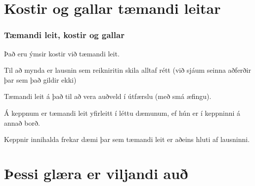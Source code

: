 \section{Kostir og gallar tæmandi leitar}
{
    \frametitle{Tæmandi leit, kostir og gallar}
    {
        \item<1-> Það eru ýmsir kostir við tæmandi leit.
        \item<2-> Til að mynda er lausnin sem reikniritin skila alltaf rétt (við sjáum seinna aðferðir þar sem það gildir ekki)
        \item<3-> Tæmandi leit á það til að vera auðveld í útfærslu (með smá æfingu).
        \item<4-> Á keppnum er tæmandi leit yfirleitt í léttu dæmunum, ef hún er í keppninni á annað borð.
        \item<5-> Keppnir innihalda frekar dæmi þar sem tæmandi leit er aðeins hluti af lausninni.
    }
}

\section{Þessi glæra er viljandi auð}
{
}


